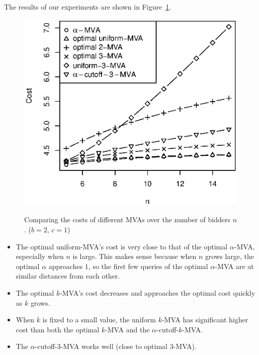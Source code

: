 The results of our experiments are shown in Figure~\ref{fig:cost_comparisons}.
\begin{figure}
\centering
    \includegraphics[trim=0 5mm 5mm 15mm, clip, width=.65\linewidth]{figures/analyze_cost_2_5_15.eps}
    \label{fig:cost_comparison_2}
    \caption{Comparing the costs of different MVAs over the number of bidders $n$. ($b = 2$, $c=1$)}
    \label{fig:cost_comparisons}
\end{figure}
\begin{itemize}
\item 
The optimal uniform-MVA's cost is very close to that of the optimal $\alpha$-MVA,
especially when $n$ is large. This makes sense because when $n$ grows
large, the optimal $\alpha$ approaches $1$, so the first few queries of
the optimal $\alpha$-MVA are at similar distances from each other.
%
\item The optimal $k$-MVA's cost decreases and approaches the optimal cost quickly
as $k$ grows.
\item When $k$ is fixed to a small value, 
the uniform $k$-MVA  has significant higher cost than both the optimal
$k$-MVA and the $\alpha$-cutoff-$k$-MVA.
\item The $\alpha$-cutoff-$3$-MVA works well (close to optimal $3$-MVA).
\end{itemize}
